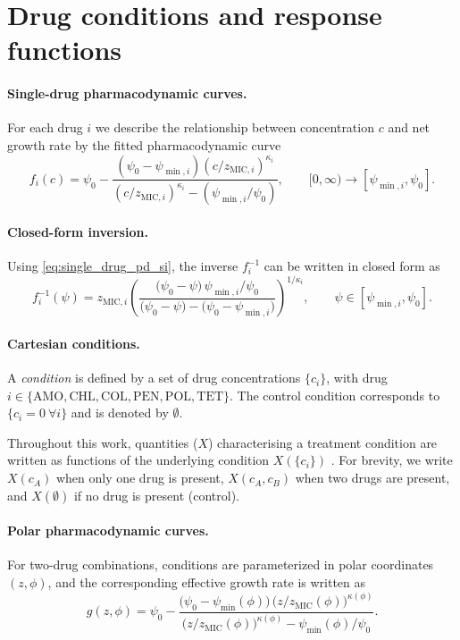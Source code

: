 
\section{Drug conditions and response functions}
\paragraph{Single-drug pharmacodynamic curves.}
For each drug \(i\) we describe the relationship between concentration \(c\) and net growth rate by the fitted pharmacodynamic curve
\begin{equation}
  f_i(c)
  =
  \psi_{0}
  -
  \frac{(\psi_{0}-\psi_{\min,i})(c/z_{\mathrm{MIC},i})^{\kappa_i}}
  {(c/z_{\mathrm{MIC},i})^{\kappa_i}-(\psi_{\min,i}/\psi_{0})},
  \qquad
  [0,\infty)\rightarrow[\psi_{\min,i},\psi_{0}].
  \label{eq:single_drug_pd_si}
\end{equation}

\paragraph{Closed-form inversion.}
Using \autoref{eq:single_drug_pd_si}, the inverse \(f_i^{-1}\) can be written in closed form as
\begin{equation}
  f_i^{-1}(\psi)
  =
  z_{\mathrm{MIC},i}
  \left(
    \frac{\bigl(\psi_0-\psi\bigr)\,\psi_{\min,i}/\psi_0}
    {\bigl(\psi_0-\psi\bigr)-\bigl(\psi_0-\psi_{\min,i}\bigr)}
  \right)^{1/\kappa_i},
  \qquad
  \psi\in[\psi_{\min,i},\psi_0].
  \label{eq:psi_inverse_closed_form}
\end{equation}

\paragraph{Cartesian conditions.}
A \emph{condition} is defined by a set of drug concentrations \(\{c_i\}\), with drug \(i \in \{\mathrm{AMO},\mathrm{CHL},\mathrm{COL},\mathrm{PEN},\mathrm{POL},\mathrm{TET}\}\).
The control condition corresponds to \(\{c_i = 0\ \forall i\}\) and is denoted by \(\emptyset\).

Throughout this work, quantities ($X$) characterising a treatment condition are written as functions of the underlying condition  \(X(\{c_i\})\) .
For brevity, we write \(X(c_A)\) when only one drug is present, \(X(c_A,c_B)\) when two drugs are present, and \(X(\emptyset)\) if no drug is present (control).

\paragraph{Polar pharmacodynamic curves.}
For two-drug combinations, conditions are parameterized in polar coordinates \((z,\phi)\), and the corresponding effective growth rate is written as
\begin{equation}
  g(z,\phi) =
  \psi_{0} -
  \frac{\bigl(\psi_{0}-\psi_{\min}(\phi)\bigr)\,\bigl(z/z_{\mathrm{MIC}}(\phi)\bigr)^{\kappa(\phi)}}
  {\bigl(z/z_{\mathrm{MIC}}(\phi)\bigr)^{\kappa(\phi)}-\psi_{\min}(\phi)/\psi_{0}}.
  \label{eq:polar_pd}
\end{equation}

